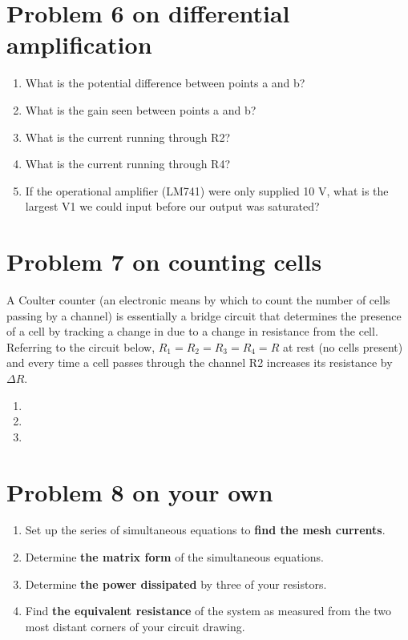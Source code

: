 \documentclass[11pt]{book}
\begin{document}
\section{Problem 6 on differential amplification}
\begin{enumerate}
	\item What is the potential difference between points a and b?
	\item What is the gain seen between points a and b?
	\item What is the current running through R2?
	\item What is the current running through R4?
	\item If the operational amplifier (LM741) were only supplied 10 V, what is the largest V1 we could input before our output was saturated?
\end{enumerate}

\section{Problem 7 on counting cells}
A Coulter counter (an electronic means by which to count the number of cells passing by a channel) is essentially a bridge circuit that determines the presence of a cell by tracking a change in due to a change in resistance from the cell. Referring to the circuit below, $R_1 = R_2 = R_3 = R_4 = R$ at rest (no cells present) and every time a cell passes through the channel R2 increases its resistance by $\Delta R$.

\begin{enumerate}
	\item 
	\item 
	\item 
\end{enumerate}


\section{Problem 8 on your own}

\begin{enumerate}
	\item Set up the series of simultaneous equations to \textbf{find the mesh currents}.
	\item Determine \textbf{the matrix form} of the simultaneous equations.
	\item Determine \textbf{the power dissipated} by three of your resistors.
	\item Find \textbf{the equivalent resistance} of the system as measured from the two most distant corners of your circuit drawing.
\end{enumerate}
\end{document}

